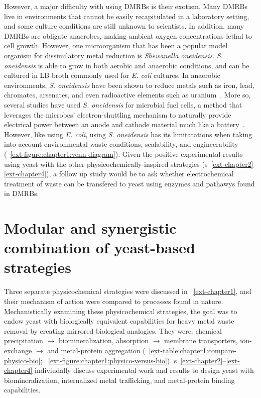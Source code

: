 \documentclass[../main/main]{subfiles}
\begin{document}
However, a major difficulty with using DMRBs is their exotism. Many DMRBs live in environments that cannot be easily recapitulated in a laboratory setting, and some culture conditions are still unknown to scientists. In addition, many DMRBs are obligate anaerobes, making ambient oxygen concentrations lethal to cell growth. However, one microorganism that has been a popular model organism for dissimilatory metal reduction is \textit{Shewanella oneidensis}. \textit{S. oneidensis} is able to grow in both aerobic and anaerobic conditions, and can be cultured in LB broth commonly used for \textit{E. coli} cultures. In anaerobic environments, \textit{S. oneidensis} have been shown to reduce metals such as iron, lead, chromates, arsenates, and even radioactive elements such as uranium~\cite{lies2005,holmes2002enrichment,lloyd2001}.
More so, several studies have used \textit{S. oneidensis} for microbial fuel cells, a method that leverages the microbes' electron-shuttling mechanism to naturally provide electrical power between an anode and cathode material much like a battery~\cite{allen1993microbial,schaetzle2008,du2007state}.
However, like using \textit{E. coli},
using \textit{S. oneidensis} has its limitatations when taking into account environmental waste conditions, scalability, and engineerability (\FIGURE~\ref{ext-figure:chapter1:venn-diagram}). Given the positive experimental results using yeast with the other physicochemically-inspired strategies (\CHAPTER{}s~\ref{ext-chapter2}--\ref{ext-chapter4}), a follow up study would be to ask whether electrochemical treatment of waste can be transfered to yeast using enzymes and pathawys found in DMRBs.

\section{Modular and synergistic combination of yeast-based strategies}
Three separate physicochemical strategies were discussed in \CHAPTER~\ref{ext-chapter1}, and their mechanism of action were compared to processes found in nature. Mechanistically examining these physicochemical strategies, the goal was to endow yeast with biologically equivalent capabilities for heavy metal waste removal by creating mirrored biological analogies. They were:
chemical precipitation $\rightarrow$ biomineralization,
absorption $\rightarrow$ membrane transporters,
ion-exchange $\rightarrow$ and metal-protein aggregation
(\TABLE~\ref{ext-table:chapter1:compare-physico-bio}; \FIGURE~\ref{ext-figure:chapter1:physico-versus-bio}).
\CHAPTER{}s~\ref{ext-chapter2}--\ref{ext-chapter4}
indiviudally discuss experimental work and results to design yeast with biomineralization, internalized metal trafficking, and metal-protein binding capabilities.
\end{document}
